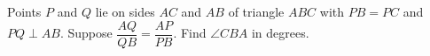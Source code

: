 Points $P$ and $Q$ lie on sides $AC$ and $AB$ of triangle $ABC$ with $PB=PC$ and $PQ\perp AB$. Suppose $\dfrac{AQ}{QB}=\dfrac{AP}{PB}$. Find $\angle CBA$ in degrees.
